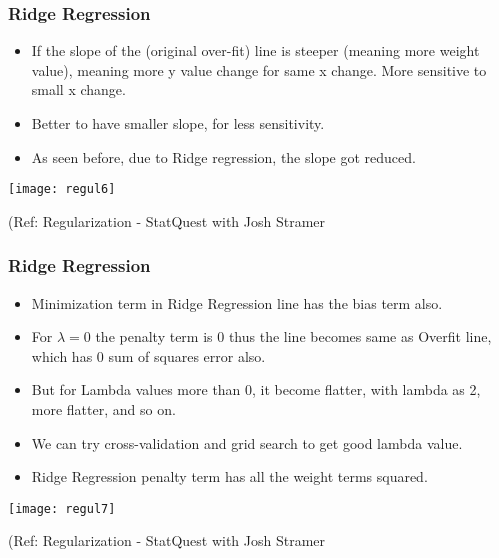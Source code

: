 \begin{frame}[fragile]\frametitle{Ridge Regression}
\begin{itemize}
\item If the slope of the (original over-fit) line is steeper (meaning more weight value), meaning more y value change for same x change. More sensitive to small x change. 
\item Better to have smaller slope, for less sensitivity.
\item As seen before, due to Ridge regression, the slope got reduced.
\end{itemize}

\begin{center}
\texttt{[image: regul6]}
\end{center}

{\tiny (Ref: Regularization - StatQuest with Josh Stramer}
\end{frame}

\begin{frame}[fragile]\frametitle{Ridge Regression}
\begin{itemize}
\item Minimization term in Ridge Regression line has the bias term also.
\item For $\lambda = 0$ the penalty term is 0 thus the line becomes same as Overfit line, which has 0 sum of squares error also.
\item But for Lambda values more than 0, it become flatter, with lambda as 2, more flatter, and so on.
\item We can try cross-validation and grid search to get good lambda value.
\item Ridge Regression penalty term has all the weight terms squared.
\end{itemize}

\begin{center}
\texttt{[image: regul7]}
\end{center}

{\tiny (Ref: Regularization - StatQuest with Josh Stramer}
\end{frame}


